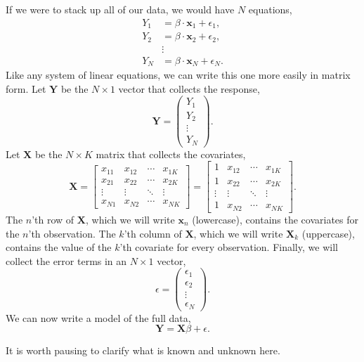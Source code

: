\documentclass[
  12pt,
  oneside,openany]{book}
\begin{document}
If we were to stack up all of our data, we would have \(N\) equations,
\[
\begin{aligned}
Y_1 &= \beta \cdot \mathbf{x}_1 + \epsilon_1, \\
Y_2 &= \beta \cdot \mathbf{x}_2 + \epsilon_2, \\
&\vdots \\
Y_N &= \beta \cdot \mathbf{x}_N + \epsilon_N.
\end{aligned}
\]
Like any system of linear equations, we can write this one more easily in matrix form. Let \(\mathbf{Y}\) be the \(N \times 1\) vector that collects the response,
\[
\mathbf{Y} = \begin{pmatrix} Y_1 \\ Y_2 \\ \vdots \\ Y_N \end{pmatrix}.
\]
Let \(\mathbf{X}\) be the \(N \times K\) matrix that collects the covariates,
\[
\mathbf{X} =
\begin{bmatrix}
  x_{11} & x_{12} & \cdots & x_{1K} \\
  x_{21} & x_{22} & \cdots & x_{2K} \\
  \vdots & \vdots & \ddots & \vdots \\
  x_{N1} & x_{N2} & \cdots & x_{NK}
\end{bmatrix}
=
\begin{bmatrix}
  1 & x_{12} & \cdots & x_{1K} \\
  1 & x_{22} & \cdots & x_{2K} \\
  \vdots & \vdots & \ddots & \vdots \\
  1 & x_{N2} & \cdots & x_{NK}
\end{bmatrix}.
\]
The \(n\)'th row of \(\mathbf{X}\), which we will write \(\mathbf{x}_n\) (lowercase), contains the covariates for the \(n\)'th observation. The \(k\)'th column of \(\mathbf{X}\), which we will write \(\mathbf{X}_k\) (uppercase), contains the value of the \(k\)'th covariate for every observation. Finally, we will collect the error terms in an \(N \times 1\) vector,
\[
\epsilon = \begin{pmatrix} \epsilon_1 \\ \epsilon_2 \\ \vdots \\ \epsilon_N \end{pmatrix}.
\]
We can now write a model of the full data,
\[
\mathbf{Y} = \mathbf{X} \beta + \epsilon.
\]

It is worth pausing to clarify what is known and unknown here.
\end{document}

